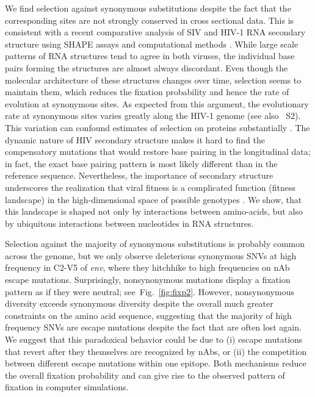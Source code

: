 \documentclass[11pt]{article}
\newcommand{\FIG}[1]{Fig.~\ref{fig:#1}}
\newcommand{\env}{\textit{env}}
\newcommand{\shankaregion}{C2-V5}
\newcommand{\syndiv}{2}
\begin{document}
We find selection against synonymous substitutions despite the
fact that the corresponding sites are not strongly conserved in
cross sectional data. This is consistent with a recent comparative
analysis of SIV and HIV-1 RNA secondary structure using SHAPE assays and
computational methods \citep{pollom_comparison_2013}. While large scale
patterns of RNA structures tend to agree in both viruses, the individual
base pairs forming the structures are almost always
discordant. Even though the molecular architecture of these structures
changes over time, selection seems to maintain them, which reduces the
fixation probability and hence the rate of evolution at synonymous
sites. As expected from this argument, the evolutionary rate
at synonymous sites varies greatly along the HIV-1 genome
\citep{mayrose_towards_2007} (see also \figurename~S\syndiv). This variation can confound estimates of
selection on proteins substantially \citep{ngandu_extensive_2008}. 
The dynamic nature of HIV secondary structure makes it hard to find the 
compensatory mutations that would restore base pairing in the
longitudinal data; in fact, the exact base pairing pattern is
most likely different than in the reference sequence. Nevertheless, the
importance of secondary structure underscores the realization that viral
fitness is a complicated function (fitness landscape) in the
high-dimensional space of possible genotypes
\citep{ferguson_translating_2013}. We show, that this landscape is shaped not
only by interactions between amino-acids, but also by ubiquitous
interactions between nucleotides in RNA structures. 


Selection against the majority of synonymous substitutions is probably
common across the genome, but we only observe deleterious synonymous SNVs
at high frequency in \shankaregion{} of \env{}, where they hitchhike to
high frequencies on nAb escape mutations. Surprisingly, nonsynonymous
mutations display a fixation pattern as if they were neutral;
see~\FIG{fixp2}. However, nonsynonymous diversity exceeds
synonymous diversity despite the overall much greater constraints on the
amino acid sequence, suggesting that the majority of high frequency SNVs
are escape mutations despite the fact that are often lost again. We suggest that this
paradoxical behavior could be due to (i) escape
mutations that revert after they themselves are recognized by nAbs, or (ii)
the competition between different escape mutations within one epitope. 
Both mechanisms reduce the overall fixation probability and can
give rise to the observed pattern of fixation in computer simulations.
\end{document}
